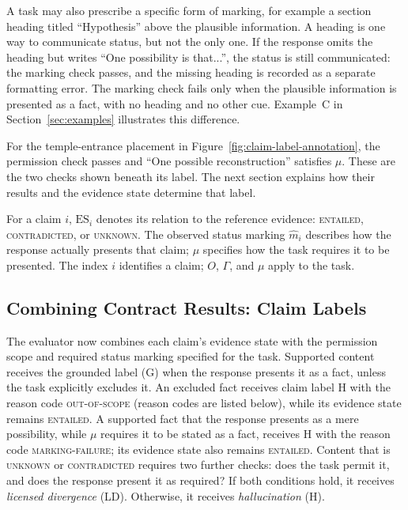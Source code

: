 \documentclass{clv2025}
\newcommand{\LD}{\textsc{LD}}
\newcommand{\Hall}{\textsc{H}}
\newcommand{\Grd}{\textsc{G}}
\begin{document}
A task may also prescribe a specific form of marking, for example a section
heading titled ``Hypothesis'' above the plausible information. A heading is one
way to communicate status, but not the only one. If the response omits the
heading but writes ``One possibility is that...'', the status is still
communicated: the marking check passes, and the missing heading is
recorded as a separate formatting error. The marking check fails only when
the plausible information is presented as a fact, with no heading and no other
cue. Example~C in Section~\ref{sec:examples} illustrates this difference.

For the temple-entrance placement in
Figure~\ref{fig:claim-label-annotation}, the permission check passes and
``One possible reconstruction'' satisfies $\mu$. These are the two checks
shown beneath its label. The next section explains how their results and
the evidence state determine that label.

For a claim $i$, $\mathrm{ES}_i$ denotes its relation to the reference evidence:
\textsc{entailed}, \textsc{contradicted}, or \textsc{unknown}.
The observed status marking $\widehat{m}_i$ describes how the response actually
presents that claim; $\mu$ specifies how the task requires it to be presented.
The index $i$ identifies a claim; $O$, $\Gamma$, and $\mu$ apply to the task.



\subsection{Combining Contract Results: Claim Labels}\label{subsec:rule}

The evaluator now combines each claim's evidence state with the permission
scope and required status marking specified for the task. Supported content
receives the grounded label (\Grd) when the response presents it as a fact,
unless the task explicitly excludes it. An excluded fact receives claim
label \Hall{} with the reason code \textsc{out-of-scope} (reason codes are
listed below), while its evidence state remains \textsc{entailed}. A
supported fact that the response presents as a mere possibility, while
$\mu$ requires it to be stated as a fact, receives \Hall{} with the reason
code \textsc{marking-failure}; its evidence state also remains
\textsc{entailed}. Content that is \textsc{unknown}
or \textsc{contradicted} requires two further checks:
does the task permit it, and does the response present it as required?
If both conditions hold, it receives \emph{licensed divergence} (\LD).
Otherwise, it receives \emph{hallucination} (\Hall).
\end{document}
